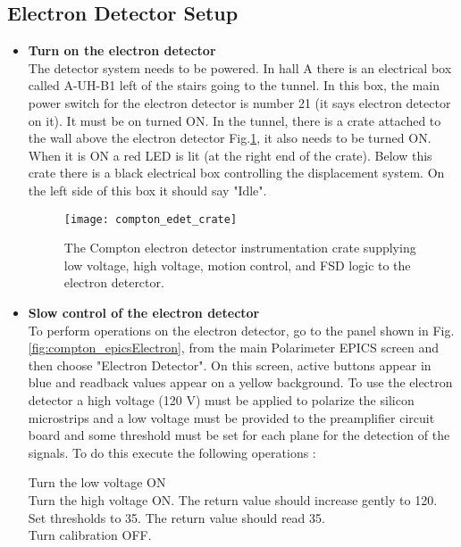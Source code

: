 \subsection{Electron Detector Setup}
\begin{itemize}
\item {\bf Turn on the electron detector}\\
        The detector system needs to be powered. In hall A there is an
        electrical box called A-UH-B1 left of the stairs going to the tunnel. 
        In this box, the main power switch for the electron detector is number 21 (it says electron
        detector on it). It must be on turned ON. In the tunnel,
        there is a crate attached to the wall above the electron detector Fig.\ref{fig:compton_edet_crate}, it also needs to be turned ON.
        When it is ON a red LED is lit (at the right end of the crate). Below this crate there is a black electrical
        box controlling the displacement system. On the left side of this box it should say "Idle".

 \begin{figure}[htp]
    \begin{center}
        \texttt{[image: compton\_edet\_crate]}
    \end{center}
    \caption[compton:electron detector crate]{
            The Compton electron detector instrumentation crate supplying low voltage, high voltage, motion control, and FSD logic to the electron deterctor.}
    \label{fig:compton_edet_crate}
 \end{figure}

\item {\bf Slow control of the electron detector }\\
To perform operations on the electron detector, go to the panel shown in Fig.\ref{fig:compton_epicsElectron}, from the main Polarimeter EPICS screen
and then choose "Electron Detector". On this screen, 
 active buttons appear in blue
and readback values appear on a yellow background. 
To use the electron detector a high voltage
(120 V) must be applied to polarize the silicon
microstrips and a low voltage must be provided to the preamplifier
circuit board and some threshold must be set for each plane for
the detection of the signals. To do this execute the following operations :

Turn the low voltage ON\\
Turn the high voltage ON. The return value should increase gently to 120.\\
Set thresholds to 35. The return value should read 35.\\
Turn calibration OFF.\\


\end{itemize}
